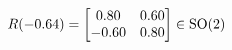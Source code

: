 \documentclass[preview]{standalone}
\begin{document}
\begin{align*}
\special{dvisvgm:raw <g id='unique000'>}R(-0.64) = \begin{bmatrix} 0.80 & 0.60 \\ -0.60 & 0.80 \end{bmatrix} \in \text{SO}(2)\special{dvisvgm:raw </g>}
\end{align*}
\end{document}
